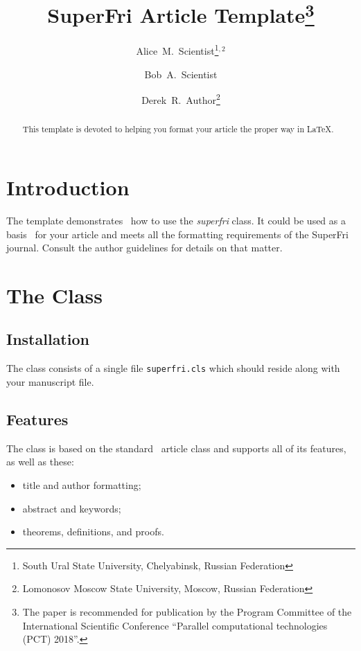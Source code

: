 \documentclass{superfri}
\begin{document}
\author{Alice~M.~Scientist\footnote{\label{susu}South Ural State University, Chelyabinsk, Russian Federation}$^{,2}$ \and  Bob~A.~Scientist \and Derek~R.~Author\footnote{\label{msu}Lomonosov Moscow State University, Moscow, Russian Federation}
}

\title{SuperFri Article Template\thanks{The paper is recommended for publication by the Program Committee of the International Scientific Conference ``Parallel computational technologies (PCT) 2018''.}}

\maketitle{}

\begin{abstract}%
This template is devoted to helping you format your article the proper way in
\LaTeX.

\end{abstract}

\section*{Introduction}
\label{sec:intro}
The template demonstrates~\cite{DBLP:conf/ics/2015} how to use the \emph{superfri} class. It could be
used as a basis~\cite{DBLP:conf/iccS/AltintasNLKDS16} for your article and meets all the formatting requirements of
the SuperFri journal. Consult the author
guidelines for details on that matter.

\section{The Class}
\label{sec:class}

\subsection{Installation}
\label{sec:install}
The class consists of a single file \verb=superfri.cls= which should reside
along with your manuscript file.

\subsection{Features}
\label{sec:features}
The class is based on the standard~\cite{DBLP:books/sp/byeon2010/RiedelSMWL10} article class and supports all of its
features, as well as these:
\begin{itemize}
\item title and author formatting;
\item abstract and keywords;
\item theorems, definitions, and proofs.
\end{itemize}
\end{document}
